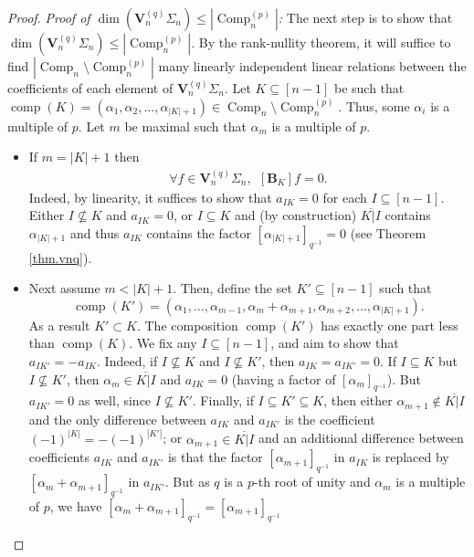 \documentclass[revision]{FPSAC2025}
\newcommand{\BB}{\mathbf{B}} %
\newcommand{\comp}{\operatorname{comp}}
\newcommand{\Comp}{\operatorname{Comp}}
\begin{document}
\begin{proof}
\textit{Proof of $\dim\left(\mathbf{V}_n^{(q)}\Sigma_n\right) \leq |\Comp_n^{(p)}|$:}
The next step is to show that $\dim\left(\mathbf{V}_n^{(q)}\Sigma_n\right) \leq |\Comp_n^{(p)}|$.
By the rank-nullity theorem, it will suffice to find $|\Comp_n \setminus \Comp_n^{(p)}|$ many linearly independent linear relations between the coefficients of each element of $\mathbf{V}_n^{(q)}\Sigma_n$.
Let $K \subseteq [n-1]$ be such that $\comp(K) = (\alpha_1, \alpha_2, \dots, \alpha_{|K|+1}) \in \Comp_n \setminus \Comp_n^{(p)}$.
Thus, some $\alpha_i$ is a multiple of $p$.
Let $m$ be maximal such that $\alpha_m$ is a multiple of $p$. 
\begin{itemize}
\item[(a)] If $m=|K|+1$ then
\begin{align}
\label{eq.linrel0q.1}
\forall f \in \mathbf{V}_n^{(q)}\Sigma_n, \ \ [\BB_K]f = 0.
\end{align}
Indeed, by linearity, it suffices to show that $a_{IK} = 0$ for each $I \subseteq [n-1]$. Either $I \nsubseteq K$ and $a_{IK} = 0$, or $I \subseteq K$ and (by construction) $\overline{K|I}$ contains $\alpha_{|K|+1}$ and thus $a_{IK}$ contains the factor $[\alpha_{|K|+1}]_{q^{-1}} = 0$ (see Theorem \ref{thm.vnq}). 
\item[(b)] Next assume $m < |K|+1$.
Then, define the set $K' \subseteq [n-1]$ such that 
\[
\comp(K') = (\alpha_1, \dots, \alpha_{m-1}, \alpha_m + \alpha_{m+1}, \alpha_{m+2},\dots, \alpha_{|K|+1}).
\]
As a result $K' \subset K$. The composition $\comp(K')$ has exactly one part less than $\comp(K)$.
We fix any $I \subseteq [n-1]$, and aim to show that $a_{IK'} = - a_{IK}$.
Indeed, if $I \nsubseteq K$ and $I \nsubseteq K'$, then $a_{IK}=a_{IK'}=0$. If $I \subseteq K$ but $I \nsubseteq K'$, then $\alpha_m \in \overline{K|I}$ and $a_{IK} = 0$ (having a factor of $[\alpha_m]_{q^{-1}}$). But $a_{IK'} =0$ as well, since $I \nsubseteq K'$.
Finally, if $I \subseteq K' \subseteq K$, then either $\alpha_{m+1} \notin \overline{K|I}$ and the only difference between $a_{IK}$ and $a_{IK'}$ is the coefficient $(-1)^{|K|} = - (-1)^{|K'|}$; or $\alpha_{m+1} \in \overline{K|I}$ and an additional difference between coefficients $a_{IK}$ and $a_{IK'}$ is that the factor $[\alpha_{m+1}]_{q^{-1}}$ in $a_{IK}$ is replaced by $[\alpha_{m}+\alpha_{m+1}]_{q^{-1}}$ in $a_{IK'}$. But as $q$ is a $p$-th root of unity and $\alpha_{m}$ is a multiple of $p$,
we have $[\alpha_{m}+\alpha_{m+1}]_{q^{-1}} = [\alpha_{m+1}]_{q^{-1}}$

\end{itemize}
\end{proof}
\end{document}

